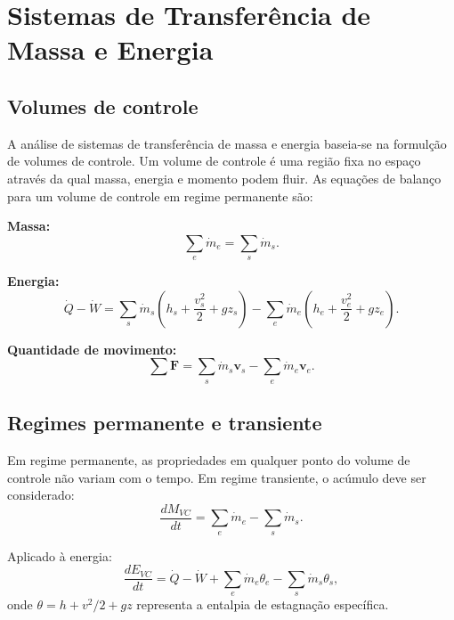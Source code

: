 \documentclass[12pt,a4paper]{article}
\numberwithin{equation}{section}
\numberwithin{table}{section}
\numberwithin{figure}{section}
\begin{document}
\section{Sistemas de Transferência de Massa e Energia}\label{sec:sistemas}

\subsection{Volumes de controle}

A análise de sistemas de transferência de massa e energia baseia-se na
formulção de volumes de controle. Um volume de controle é uma região fixa no
espaço através da qual massa, energia e momento podem fluir. As equações de
balanço para um volume de controle em regime permanente são:

\textbf{Massa:}
\begin{equation}\label{eq:v1-c6-1}
\sum_e \dot{m}_e = \sum_s \dot{m}_s.
\end{equation}

\textbf{Energia:}
\begin{equation}\label{eq:v1-c6-2}
\dot{Q} - \dot{W} = \sum_s \dot{m}_s\left(h_s + \frac{v_s^2}{2} + gz_s\right) - \sum_e \dot{m}_e\left(h_e + \frac{v_e^2}{2} + gz_e\right).
\end{equation}

\textbf{Quantidade de movimento:}
\begin{equation}\label{eq:v1-c6-3}
\sum \mathbf{F} = \sum_s \dot{m}_s \mathbf{v}_s - \sum_e \dot{m}_e \mathbf{v}_e.
\end{equation}

\subsection{Regimes permanente e transiente}

Em regime permanente, as propriedades em qualquer ponto do volume de controle
não variam com o tempo. Em regime transiente, o acúmulo deve ser considerado:
\begin{equation}\label{eq:v1-c6-4}
\frac{dM_{VC}}{dt} = \sum_e \dot{m}_e - \sum_s \dot{m}_s.
\end{equation}

Aplicado à energia:
\begin{equation}\label{eq:v1-c6-5}
\frac{dE_{VC}}{dt} = \dot{Q} - \dot{W} + \sum_e \dot{m}_e\theta_e - \sum_s \dot{m}_s\theta_s,
\end{equation}
onde $\theta = h + v^2/2 + gz$ representa a entalpia de estagnação específica.
\end{document}
